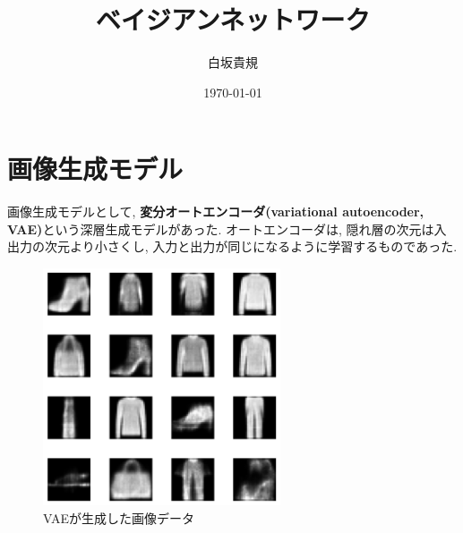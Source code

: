 \documentclass[twocolumn]{jarticle}
\title{ベイジアンネットワーク}
\author{白坂貴規}
\date{\today}
\begin{document}
\maketitle

\section{画像生成モデル}
画像生成モデルとして, {\bf 変分オートエンコーダ(variational autoencoder, VAE)}という深層生成モデルがあった. オートエンコーダは, 隠れ層の次元は入出力の次元より小さくし, 入力と出力が同じになるように学習するものであった.

\begin{figure}[!htbp]
 \begin{center}
   \includegraphics[width=7cm]{./VAE.png}
   \caption{VAEが生成した画像データ}
   \label{fig:}
 \end{center}
\end{figure}
\end{document}
